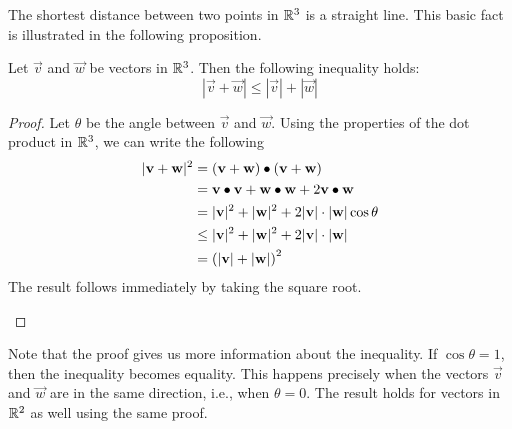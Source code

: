 \documentclass[handout]{ximera}
\begin{document}
The shortest distance between two points in $\mathbb R^3$ is a straight line.  This basic fact is illustrated in the following proposition.

\begin{proposition}
Let $\vec{v}$ and $\vec{w}$ be vectors in $\mathbb R^3$. Then the following inequality holds:
\[
|\vec{v} + \vec{w}| \leq |\vec{v}| +|\vec{w}| 
\]



\begin{proof}
Let $\theta$ be the angle between $\vec v$ and $\vec w$. Using the properties of the dot product in $\mathbb R^3$, we can write the following
\begin{align*}
|\mathbf{v} + \mathbf{w}|^2 &= \left(\mathbf{v} + \mathbf{w}\right) \bullet \left(\mathbf{v} + \mathbf{w}\right)\\
                        &= \mathbf{v} \bullet \mathbf{v} + \mathbf{w}\bullet \mathbf{w} + 2\mathbf{v} \bullet \mathbf{w}\\
                        &= |\mathbf{v}|^2 +|\mathbf{w}|^2 + 2|\mathbf{v}|\cdot |\mathbf{w}| \cos \theta\\
                        &\leq |\mathbf{v}|^2 +|\mathbf{w}|^2 + 2|\mathbf{v}|\cdot |\mathbf{w}|\\
                        &= \left(|\mathbf{v}| + |\mathbf{w}|\right)^2
\end{align*}
The result follows immediately by taking the square root.
          
\begin{image}
\end{image}

              
\end{proof}

\end{proposition}

Note that the proof gives us more information about the inequality. 
If $\cos \theta = 1$, then the inequality becomes equality.  This happens precisely 
when the vectors $\vec{v}$ and $\vec{w}$ are in the same direction, i.e., when $\theta = 0$. 
The result holds for vectors in $\mathbb R^2$ as well using the same proof.
\end{document}
